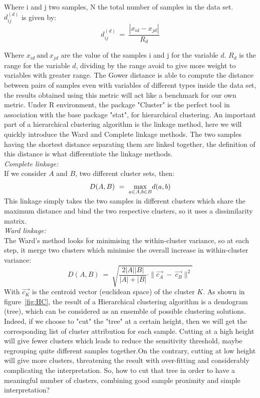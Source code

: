 \documentclass[twocolumn]{article}
\begin{document}
Where i and j two samples, N the total number of samples in the data set.\\
$d_{ij}^{(d)}$ is given by:\\
$$d_{ij}^{(d)}\ =\ \frac{|x_{id}-x_{jd}|}{R_d}$$


Where $x_{id}\ \text{and}\ x_{jd}$ are the value of the samples i and j for the variable $d$.
$R_d$ is the range for the variable $d$, dividing by the range avoid to give more weight to variables with greater range.
The Gower distance is able to compute the distance between pairs of samples even with variables of different types inside the data set, the results obtained using this metric will act like a benchmark for our own metric.
Under R environment, the package "Cluster"\cite{maechler} is the perfect tool in association with the base package "stat", for hierarchical clustering.
An important part of a hierarchical clustering algorithm is the linkage method, here we will quickly introduce the Ward and Complete linkage methods.
The two samples having the shortest distance separating them are linked together, the definition of this distance is what differentiate the linkage methods.\\
\emph{Complete linkage:}\\
If we consider $A$ and $B$, two different cluster sets, then:
\begin{equation}\label{equ:comp}
    D(A,B)\ =\ \smash{\displaystyle\max_{a\in A,b\in B}}d(a,b)
\end{equation}
This linkage simply takes the two samples in different clusters which share the maximum distance and bind the two respective clusters, so it uses a dissimilarity matrix.\\
\emph{Ward linkage:}\\
The Ward's method looks for minimising the within-cluster variance, so at each step, it merge two clusters which minimise the overall increase in within-cluster variance:
\begin{equation}\label{equ:ward}
    D(A,B)\ =\ \sqrt{\frac{2|A||B|}{|A|+|B|}\cdot \|\overrightarrow{c_A}\ -\ \overrightarrow{c_B}\|^2}
\end{equation}
With $\overrightarrow{c_K}$ is the centroid vector (euclidean space) of the cluster $K$.
As shown in figure~\ref{fig:HC}, the result of a Hierarchical clustering algorithm is a dendogram (tree), which can be considered as an ensemble of possible clustering solutions.
Indeed, if we choose to "cut" the "tree" at a certain height, then we will get the corresponding list of cluster attribution for each sample. Cutting at a high height will give fewer clusters which leads to reduce the sensitivity threshold, maybe regrouping quite different samples together.On the contrary, cutting at low height will give more clusters, threatening the result with over-fitting and considerably complicating the interpretation. So, how to cut that tree in order to have a meaningful number of clusters, combining good sample proximity and simple interpretation?
\end{document}
